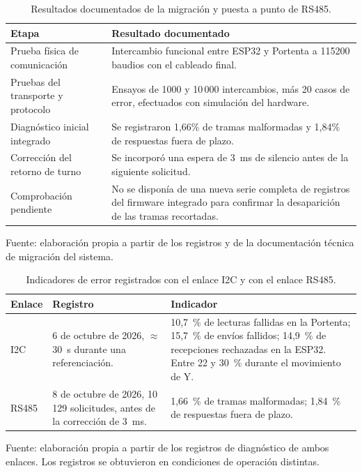 \begin{table}[H]
    \centering
    \caption{Resultados documentados de la migración y puesta a punto de RS485.}
    \label{tab:fase4_pruebas_rs485}
    \begin{tabular}{p{}p{}}
        \hline
        Etapa & Resultado documentado \\
        \hline
        Prueba física de comunicación & Intercambio funcional entre ESP32 y Portenta a 115200 baudios con el cableado final. \\
        Pruebas del transporte y protocolo & Ensayos de 1000 y 10\,000 intercambios, más 20 casos de error, efectuados con simulación del hardware. \\
        Diagnóstico inicial integrado & Se registraron 1,66\% de tramas malformadas y 1,84\% de respuestas fuera de plazo. \\
        Corrección del retorno de turno & Se incorporó una espera de 3~ms de silencio antes de la siguiente solicitud. \\
        Comprobación pendiente & No se disponía de una nueva serie completa de registros del firmware integrado para confirmar la desaparición de las tramas recortadas. \\
        \hline
    \end{tabular}
    \par\small\raggedright Fuente: elaboración propia a partir de los registros y de la documentación técnica de migración del sistema.
\end{table}

\begin{table}[H]
    \centering
    \caption{Indicadores de error registrados con el enlace I2C y con el enlace RS485.}
    \label{tab:fase4_errores_enlaces}
    \begin{tabular}{p{}p{}p{}}
        \hline
        Enlace & Registro & Indicador \\
        \hline
        I2C & 6 de octubre de 2026, $\approx$30~s durante una referenciación. &
        10,7~\% de lecturas fallidas en la Portenta; 15,7~\% de envíos fallidos; 14,9~\% de recepciones rechazadas en la ESP32. Entre 22 y 30~\% durante el movimiento de Y. \\
        RS485 & 8 de octubre de 2026, 10\,129 solicitudes, antes de la corrección de 3~ms. &
        1,66~\% de tramas malformadas; 1,84~\% de respuestas fuera de plazo. \\
        \hline
    \end{tabular}
    \par\small\raggedright Fuente: elaboración propia a partir de los registros de diagnóstico de ambos enlaces. Los registros se obtuvieron en condiciones de operación distintas.
\end{table}

